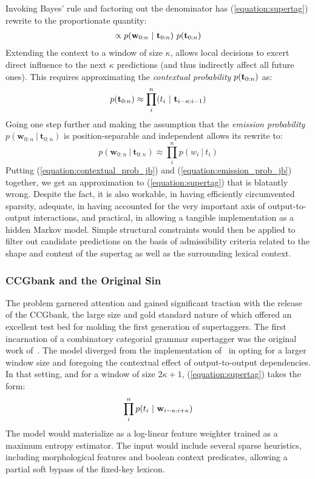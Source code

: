 Invoking Bayes' rule and factoring out the denominator has (\ref{equation:supertag}) rewrite to the proportionate quantity:
\begin{align}
\propto p(\mathbf{w}_{0:n} \ | \ \mathbf{t}_{0:n})~ p(\mathbf{t}_{0:n})
\end{align}
Extending the context to a window of size $\kappa$, allows local decisions to excert direct influence to the next $\kappa$ predictions (and thus indirectly affect all future ones).
This requires approximating the \textit{contextual probability} $p(\mathbf{t}_{0:n})$ as:
\begin{equation}\label{equation:contextual_prob_jb}
p(\mathbf{t}_{0:n}) \approx \prod_i^n (t_i \ | \ \mathbf{t}_{i-\kappa:i-1})
\end{equation}
Going one step further and making the assumption that the \textit{emission probability} $p(\mathbf{w}_{0:n} \ | \ \mathbf{t}_{0:n})$ is position-separable and independent allows its rewrite to:
\begin{equation}\label{equation:emission_prob_jb}
p(\mathbf{w}_{0:n} \ | \ \mathbf{t}_{0:n}) \approx \prod_i^n p(w_i \ | \ t_i)
\end{equation}
Putting (\ref{equation:contextual_prob_jb}) and (\ref{equation:emission_prob_jb}) together, we get an approximation to (\ref{equation:supertag}) that is blatantly wrong.
Despite the fact, it is also workable, in having efficiently circumvented sparsity, adequate, in having accounted for the very important axis of output-to-output interactions, and practical, in allowing a tangible implementation as a hidden Markov model.
Simple structural constraints would then be applied to filter out candidate predictions on the basis of admissibility criteria related to the shape and content of the supertag as well as the surrounding lexical context.


\subsubsection{CCGbank and the Original Sin}
The problem garnered attention and gained significant traction with the release of the CCGbank, the large size and gold standard nature of which offered an excellent test bed for molding the first generation of supertaggers.
The first incarnation of a combinatory categorial grammar supertagger was the original work of~\citet{clark2002supertagging}.
The model diverged from the implementation of~\citet{bangalore1999supertagging} in opting for a larger window size and foregoing the contextual effect of output-to-output dependencies.
In that setting, and for a window of size $2\kappa + 1$, (\ref{equation:supertag}) takes the form:
\begin{equation}
	\prod_i^n p(t_i \ | \ \mathbf{w}_{i - \kappa : i+\kappa})
\end{equation}
The model would materialize as a log-linear feature weighter trained as a maximum entropy estimator.
The input would include several sparse heuristics, including morphological features and boolean context predicates, allowing a partial soft bypass of the fixed-key lexicon.

